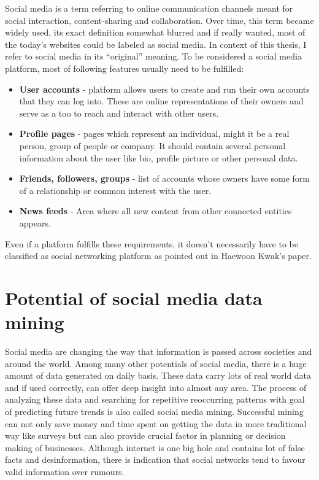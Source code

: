 Social media is a term referring to online communication channels meant for social interaction, content-sharing and collaboration. Over time, this term became widely used, its exact definition somewhat blurred and if really wanted, most of the today's websites could be labeled as social media. In context of this thesis,  I refer to social media in its “original” meaning. To be considered a social media platform, most of following features usually need to be fulfilled:

\begin{itemize}
  \item \textbf{User accounts} - platform allows users to create and run their own accounts that they can log into. These are online representations of their owners and serve as a too to reach and interact with other users.
  \item \textbf{Profile pages} - pages which represent an individual, might it be a real person, group of people or company. It should contain several personal information about the user like bio, profile picture or other personal data.
  \item \textbf{Friends, followers, groups} - list of accounts whose owners have some form of a relationship  or common interest with the user.
  \item \textbf{News feeds} - Area where all new content from other connected entities appears.
\end{itemize}

Even if a platform fulfills these requirements, it doesn't necessarily have to be classified as social networking platform as pointed out in Haewoon Kwak's paper\cite{kwak2010twitter}.

\section{Potential of social media data mining}
Social media are changing the way that information is passed across societies and around the world.\cite{mayfield2008social}
Among many other potentials of social media, there is a huge amount of data generated on daily basis. These data carry lots of real world data and if used correctly, can offer deep insight into almost any area. The process of analyzing these data and searching for repetitive reoccurring patterns with goal of predicting future trends is also called social media mining. Successful mining can not only save money and time spent on getting the data in more traditional way like surveys but can also provide crucial factor in planning or decision making of businesses. Although internet is one big hole and contains lot of false facts and desinformation, there is indication that social networks tend to favour
valid information over rumours.\cite{castillo2011information} 

